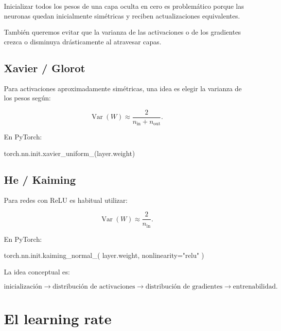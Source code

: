 \documentclass[
  letterpaper,
  DIV=11,
  numbers=noendperiod]{scrartcl}
\newenvironment{Shaded}{\begin{snugshade}}{\end{snugshade}}
\newcommand{\NormalTok}[1]{\textcolor[rgb]{0.00,0.23,0.31}{#1}}
\newcommand{\OperatorTok}[1]{\textcolor[rgb]{0.37,0.37,0.37}{#1}}
\newcommand{\StringTok}[1]{\textcolor[rgb]{0.13,0.47,0.30}{#1}}
\begin{document}
Inicializar todos los pesos de una capa oculta en cero es problemático
porque las neuronas quedan inicialmente simétricas y reciben
actualizaciones equivalentes.

También queremos evitar que la varianza de las activaciones o de los
gradientes crezca o disminuya drásticamente al atravesar capas.

\subsection{Xavier / Glorot}\label{xavier-glorot}

Para activaciones aproximadamente simétricas, una idea es elegir la
varianza de los pesos según:

\[
\operatorname{Var}(W)
\approx
\frac{2}
{n_{\mathrm{in}}+n_{\mathrm{out}}}.
\]

En PyTorch:

\begin{Shaded}
\begin{Highlighting}[]
\NormalTok{torch.nn.init.xavier\_uniform\_(layer.weight)}
\end{Highlighting}
\end{Shaded}

\subsection{He / Kaiming}\label{he-kaiming}

Para redes con ReLU es habitual utilizar:

\[
\operatorname{Var}(W)
\approx
\frac{2}{n_{\mathrm{in}}}.
\]

En PyTorch:

\begin{Shaded}
\begin{Highlighting}[]
\NormalTok{torch.nn.init.kaiming\_normal\_(}
\NormalTok{    layer.weight,}
\NormalTok{    nonlinearity}\OperatorTok{=}\StringTok{"relu"}
\NormalTok{)}
\end{Highlighting}
\end{Shaded}

La idea conceptual es:

\[
\boxed{
\text{inicialización}
\rightarrow
\text{distribución de activaciones}
\rightarrow
\text{distribución de gradientes}
\rightarrow
\text{entrenabilidad}.
}
\]

\section{El learning rate}\label{el-learning-rate}
\end{document}
